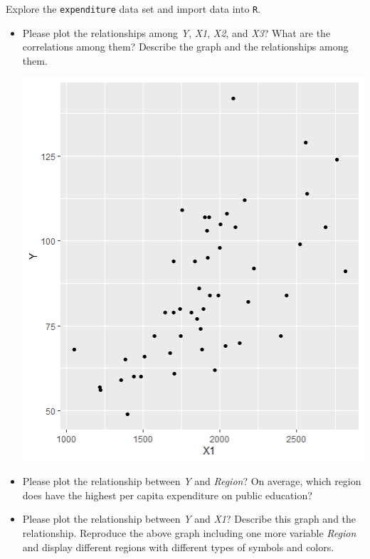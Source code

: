 \documentclass[12pt,letterpaper]{article}
\begin{document}
\vspace{.5cm}
\noindent Explore the \texttt{expenditure} data set and import data into \texttt{R}.
\vspace{.5cm}
  
\vspace{.5cm}
\begin{itemize}

\item
Please plot the relationships among \emph{Y}, \emph{X1}, \emph{X2}, and \emph{X3}? What are the correlations among them? Describe the graph and the relationships among them.
\vspace{.5cm}

\usepackage{graphicx}
\graphicspath{{./PS1/}}
\includegraphics{Y vs X1}

\item
Please plot the relationship between \emph{Y} and \emph{Region}? On average, which region does have the highest per capita expenditure on public education?
\vspace{.5cm}
\item
Please plot the relationship between \emph{Y} and \emph{X1}? Describe this graph and the relationship. Reproduce the above graph including one more variable \emph{Region} and display different regions with different types of symbols and colors.
\end{itemize}
\end{document}
